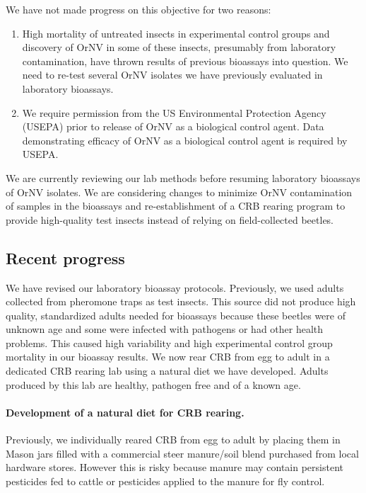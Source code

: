 \documentclass[12pt,letterpaper,english,bibliography=totocnumbered, abstract=on]{scrartcl}
\begin{document}
We have not made progress on this objective for two reasons:
\begin{enumerate}
	\item High mortality of untreated insects in experimental control groups and discovery of OrNV in some of these insects, presumably from laboratory contamination, have thrown results of previous bioassays into question.  We need to re-test several OrNV isolates we have previously evaluated in laboratory bioassays.
	\item We require permission from the US Environmental Protection Agency (USEPA) prior to release of OrNV as a biological control agent. Data demonstrating efficacy of OrNV as a biological control agent is required by USEPA.  
\end{enumerate}

We are currently reviewing our lab methods before resuming laboratory bioassays of OrNV isolates. We are considering changes to minimize OrNV contamination of samples in the bioassays and re-establishment of a CRB rearing program to provide high-quality test insects instead of relying on field-collected beetles.

\subsection{Recent progress}

We have revised our laboratory bioassay protocols. Previously, we used adults collected from pheromone traps as test insects. This source did not produce high quality, standardized adults needed for bioassays because these beetles were of unknown age and some were infected with pathogens or had other health problems. This caused high variability and high experimental control group mortality in our bioassay results. We now rear CRB from egg to adult in a dedicated CRB rearing lab using a natural diet we have developed. Adults produced by this lab are healthy, pathogen free and of a known age.

\paragraph{Development of a natural diet for CRB rearing.}

Previously, we individually reared CRB from egg to adult by placing them in Mason jars filled with a commercial steer manure/soil blend purchased from local hardware stores. However this is risky because manure may contain persistent pesticides fed to cattle or pesticides applied to the manure for fly control. 
\end{document}
